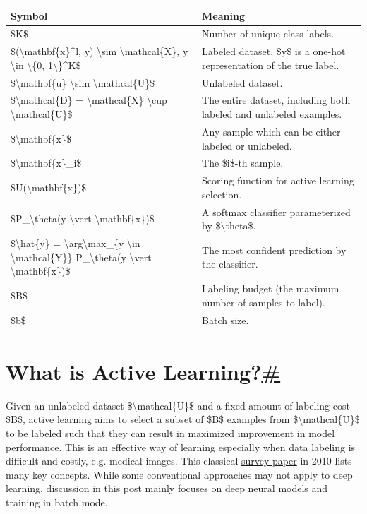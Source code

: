 \begin{longtable}[]{@{}ll@{}}
\toprule\noalign{}
Symbol & Meaning \\
\midrule\noalign{}
\endhead
\bottomrule\noalign{}
\endlastfoot
\$K\$ & Number of unique class labels. \\
\$(\textbackslash mathbf\{x\}\^{}l, y) \textbackslash sim \textbackslash mathcal\{X\}, y \textbackslash in \textbackslash\{0, 1\textbackslash\}\^{}K\$ & Labeled dataset. \$y\$ is a one-hot representation of the true label. \\
\$\textbackslash mathbf\{u\} \textbackslash sim \textbackslash mathcal\{U\}\$ & Unlabeled dataset. \\
\$\textbackslash mathcal\{D\} = \textbackslash mathcal\{X\} \textbackslash cup \textbackslash mathcal\{U\}\$ & The entire dataset, including both labeled and unlabeled examples. \\
\$\textbackslash mathbf\{x\}\$ & Any sample which can be either labeled or unlabeled. \\
\$\textbackslash mathbf\{x\}\_i\$ & The \$i\$-th sample. \\
\$U(\textbackslash mathbf\{x\})\$ & Scoring function for active learning selection. \\
\$P\_\textbackslash theta(y \textbackslash vert \textbackslash mathbf\{x\})\$ & A softmax classifier parameterized by \$\textbackslash theta\$. \\
\$\textbackslash hat\{y\} = \textbackslash arg\textbackslash max\_\{y \textbackslash in \textbackslash mathcal\{Y\}\} P\_\textbackslash theta(y \textbackslash vert \textbackslash mathbf\{x\})\$ & The most confident prediction by the classifier. \\
\$B\$ & Labeling budget (the maximum number of samples to label). \\
\$b\$ & Batch size. \\
\end{longtable}

\section{\texorpdfstring{What is Active Learning?\hyperref[what-is-active-learning]{\#}}{What is Active Learning?\#}}\label{what-is-active-learning}

Given an unlabeled dataset \$\textbackslash mathcal\{U\}\$ and a fixed amount of labeling cost \$B\$, active learning aims to select a subset of \$B\$ examples from \$\textbackslash mathcal\{U\}\$ to be labeled such that they can result in maximized improvement in model performance. This is an effective way of learning especially when data labeling is difficult and costly, e.g. medical images. This classical \href{https://burrsettles.com/pub/settles.activelearning.pdf}{survey paper} in 2010 lists many key concepts. While some conventional approaches may not apply to deep learning, discussion in this post mainly focuses on deep neural models and training in batch mode.

